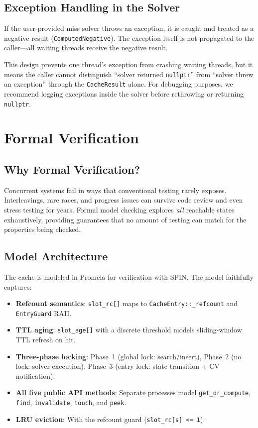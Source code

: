 \documentclass[11pt,a4paper]{article}
\begin{document}
\subsection{Exception Handling in the Solver}

If the user-provided miss solver throws an exception, it is caught and
treated as a negative result (\texttt{ComputedNegative}).  The exception
itself is not propagated to the caller---all waiting threads receive the
negative result.

This design prevents one thread's exception from crashing waiting
threads, but it means the caller cannot distinguish ``solver returned
\texttt{nullptr}'' from ``solver threw an exception'' through the
\texttt{CacheResult} alone.  For debugging purposes, we recommend
logging exceptions inside the solver before rethrowing or returning
\texttt{nullptr}.

\section{Formal Verification}
\label{sec:formal-verification}

\subsection{Why Formal Verification?}

Concurrent systems fail in ways that conventional testing rarely
exposes.  Interleavings, rare races, and progress issues can survive
code review and even stress testing for years.  Formal model checking
explores \emph{all} reachable states exhaustively, providing guarantees
that no amount of testing can match for the properties being checked.

\subsection{Model Architecture}

The cache is modeled in Promela for verification with SPIN.  The model
faithfully captures:

\begin{itemize}
\item \textbf{Refcount semantics}: \texttt{slot\_rc[]} maps to
      \texttt{CacheEntry::\_refcount} and \texttt{EntryGuard} RAII.
\item \textbf{TTL aging}: \texttt{slot\_age[]} with a discrete threshold
      models sliding-window TTL refresh on hit.
\item \textbf{Three-phase locking}: Phase~1 (global lock: search/insert),
      Phase~2 (no lock: solver execution), Phase~3 (entry lock: state
      transition + CV notification).
\item \textbf{All five public API methods}: Separate processes model
      \texttt{get\_or\_compute}, \texttt{find}, \texttt{invalidate},
      \texttt{touch}, and \texttt{peek}.
\item \textbf{LRU eviction}: With the refcount guard
      (\texttt{slot\_rc[s] <= 1}).
\end{itemize}
\end{document}
